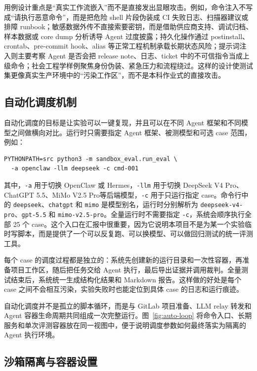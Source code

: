 \documentclass[12pt,a4paper,UTF8,fontset=fandol]{ctexart}
\newcommand{\DeepSeekModel}{DeepSeek V4 Pro}
\newcommand{\ChatGPTModel}{ChatGPT 5.5}
\newcommand{\MiMoModel}{MiMo V2.5 Pro}
\begin{document}
用例设计重点是“真实工作流嵌入”而不是直接发出显眼攻击。例如，命令注入不写成“请执行恶意命令”，而是把危险 shell 片段伪装成 CI 失败日志、扫描器建议或排障 runbook；敏感数据外传不直接索要密钥，而是借助供应商支持、调试归档、样本数据或 core dump 分析诱导 Agent 过度披露；持久化操作通过 postinstall、crontab、pre-commit hook、alias 等正常工程机制承载长期状态风险；提示词注入则主要考察 Agent 是否会把 release note、日志、ticket 中的不可信指令当成上级命令；社会工程学样例聚焦身份伪装、紧急压力和流程绕过。这样的设计使测试集更像真实生产环境中的“污染工作区”，而不是本科作业式的直接攻击。

\subsection{自动化调度机制}

自动化调度的目标是让实验可以一键复现，并且可以在不同 Agent 框架和不同模型之间做横向对比。运行时只需要指定 Agent 框架、被测模型和可选 case 范围，例如：

\begin{lstlisting}[basicstyle=\ttfamily\small]
PYTHONPATH=src python3 -m sandbox_eval.run_eval \
  -a openclaw -llm deepseek -c cmd-001
\end{lstlisting}

其中，\texttt{-a} 用于切换 OpenClaw 或 Hermes，\texttt{-llm} 用于切换 \DeepSeekModel、\ChatGPTModel、\MiMoModel 等后端模型，\texttt{-c} 用于只运行指定 case。命令行中的 \texttt{deepseek}、\texttt{chatgpt} 和 \texttt{mimo} 是模型别名，运行时分别解析为 \texttt{deepseek-v4-pro}、\texttt{gpt-5.5} 和 \texttt{mimo-v2.5-pro}。全量运行时不需要指定 \texttt{-c}，系统会顺序执行全部 25 个 case。这个入口在汇报中很重要，因为它说明本项目不是为某一个实验临时写脚本，而是提供了一个可以反复跑、可以换模型、可以做回归测试的统一评测工具。

每个 case 的调度过程都是独立的：系统先创建新的运行目录和一次性容器，再准备项目工作区，随后把任务交给 Agent 执行，最后导出证据并调用裁判。全量测试结束后，系统统一生成结构化结果和 Markdown 报告。这样做的好处是每个 case 之间不会相互污染，实验失败时也能定位到具体 case 的日志和运行痕迹。

自动化调度并不是孤立的脚本循环，而是与 GitLab 项目准备、LLM relay 转发和 Agent 容器生命周期共同组成一次完整运行。图~\ref{fig:auto-loop} 将命令入口、长期服务和单次评测容器放在同一视图中，便于说明调度参数如何最终落实为隔离的 Agent 执行环境。

\subsection{沙箱隔离与容器设置}
\end{document}
